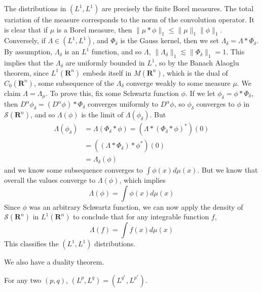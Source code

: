 \begin{example}
	The distributions in $(L^1, L^1)$ are precisely the finite Borel measures. The total variation of the measure corresponds to the norm of the convolution operator. It is clear that if $\mu$ is a Borel measure, then $\| \mu * \phi \|_1 \leq \| \mu \|_1 \| \phi \|_1$. Conversely, if $\Lambda \in (L^1, L^1)$, and $\Phi_\delta$ is the Gauss kernel, then we set $\Lambda_\delta = \Lambda * \Phi_\delta$. By assumption, $\Lambda_\delta$ is an $L^1$ function, and so $\Lambda$, $\| \Lambda_\delta \|_1 \lesssim \| \Phi_\delta \|_1 = 1$. This implies that the $\Lambda_\delta$ are uniformly bounded in $L^1$, so by the Banach Alaoglu theorem, since $L^1(\mathbf{R}^n)$ embeds itself in $M(\mathbf{R}^n)$, which is the dual of $C_0(\mathbf{R}^n)$, some subsequence of the $\Lambda_\delta$ converge weakly to some measure $\mu$. We claim $\Lambda = \Lambda_\mu$. To prove this, fix some Schwartz function $\phi$. If we let $\phi_\delta = \phi * \Phi_\delta$, then $D^\alpha \phi_\delta = (D^\alpha \phi) * \Phi_\delta$ converges uniformly to $D^\alpha \phi$, so $\phi_\delta$ converges to $\phi$ in $\mathcal{S}(\mathbf{R}^n)$, and so $\Lambda(\phi)$ is the limit of $\Lambda(\phi_\delta)$. But
	\begin{align*}
		\Lambda(\phi_\delta) &= \Lambda(\Phi_\delta * \phi) = (\Lambda * (\Phi_\delta * \phi)^*)(0)\\
		&= ((\Lambda * \Phi_\delta) * \phi^*)(0)\\
		&= \Lambda_\delta(\phi)
	\end{align*}
	and we know some subsequence converges to $\int \phi(x) d\mu(x)$. But we know that overall the values converge to $\Lambda(\phi)$, which implies
	\[ \Lambda(\phi) = \int \phi(x) d\mu(x) \]
	Since $\phi$ was an arbitrary Schwartz function, we can now apply the density of $\mathcal{S}(\mathbf{R}^n)$ in $L^1(\mathbf{R}^n)$ to conclude that for any integrable function $f$,
	\[ \Lambda(f) = \int f(x) d\mu(x) \]
	This classifies the $(L^1, L^1)$ distributions.
\end{example}

We also have a duality theorem.

\begin{theorem}
	For any two $(p,q)$, $(L^p,L^q) = (L^{q^*}, L^{p^*})$.
\end{theorem}













